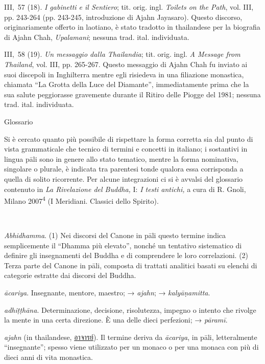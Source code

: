 III,~57 (18). \emph{I gabinetti e il Sentiero}; tit. orig. ingl.
\emph{Toilets on the Path}, vol. III, pp. 243-264 (pp. 243-245,
introduzione di Ajahn Jayasaro). Questo discorso, originariamente
offerto in laotiano, è stato tradotto in thailandese per la biografia di
Ajahn Chah, \emph{Upalamani}; nessuna trad. ital. individuata.

III,~58 (19). \emph{Un messaggio dalla Thailandia}; tit. orig. ingl.
\emph{A Message from Thailand}, vol. III, pp. 265-267. Questo messaggio
di Ajahn Chah fu inviato ai suoi discepoli in Inghilterra mentre egli
risiedeva in una filiazione monastica, chiamata ``La Grotta della Luce
del Diamante'', immediatamente prima che la sua salute peggiorasse
gravemente durante il Ritiro delle Piogge del 1981; nessuna trad. ital.
individuata.

Glossario

Si è cercato quanto più possibile di rispettare la forma corretta sia
dal punto di vista grammaticale che tecnico di termini e concetti in
italiano; i sostantivi in lingua pāli sono in genere allo stato
tematico, mentre la forma nominativa, singolare o plurale, è indicata
tra parentesi tonde qualora essa corrisponda a quella di solito
ricorrente. Per alcune integrazioni ci si è avvalsi del glossario
contenuto in \emph{La Rivelazione del Buddha,} I: \emph{I testi
antichi,} a cura di R. Gnoli, Milano 2007\textsuperscript{4} (I
Meridiani. Classici dello Spirito).



\emph{Abhidhamma}. (1) Nei discorsi del Canone in pāli questo termine
indica semplicemente il ``Dhamma più elevato'', nonché un tentativo
sistematico di definire gli insegnamenti del Buddha e di comprendere le
loro correlazioni. (2) Terza parte del Canone in pāli, composta di
trattati analitici basati su elenchi di categorie estratte dai discorsi
del Buddha.

\emph{ācariya}. Insegnante, mentore, maestro; → \emph{ajahn}; →
\emph{kalyāṇamitta}.

\emph{adhiṭṭhāna}. Determinazione, decisione, risolutezza, impegno o
intento che rivolge la mente in una certa direzione. È una delle dieci
perfezioni; → \emph{pāramī}.

\emph{ajahn} (in thailandese,
\href{http://www.thai2english.com/dictionary/1453955.html}{อาจารย์}). Il
termine deriva da \emph{ācariya}, in pāli, letteralmente ``insegnante'';
spesso viene utilizzato per un monaco o per una monaca con più di dieci
anni di vita monastica.

